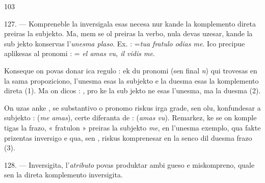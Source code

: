 \begin{VUpage}[107]{103}

127. --- Kompreneble la  inversigala esas necesa nur\nl
kande la komplemento direta preiras la subjekto. Ma, mem\nl
se ol preiras la verbo, nula  devas uzesar, kande la sub\cc
jekto konservas l'\textit{unesma plaso}. Ex. : \nl
=\textit{tua fratulo odias me}. Ico precipue aplikesas al pronomi :\nl
{} = \textit{el amas vu, il vidis me}.

Konseque on povas donar ica regulo : ek du pronomi\nl
(sen final \textit{n}) qui trovesas en la sama propoziciono, l'unesma\nl
esas la subjekto e la duesma esas la komplemento direta (1).\nl
Ma on dicos : , pro ke la sub\cc
jekto ne esas l'unesma, ma la duesma (2).

On uzas anke , se substantivo o pronomo riskus irga\cc
grade, sen olu, konfundesar a subjekto : \nl
{} (\textit{me amas}), certe diferanta de : \nl
{} (\textit{amas vu}). Remarkez, ke se on komple\cc
tigas la frazo, « fratulon » preiras la subjekto \textit{me}, en\nl
l'unesma exemplo, qua fakte prizentas inversigo e qua, sen ,\nl
riskus komprenesar en la senco dil duesma frazo (3).

\VUblanc{5.66pt}%
128. --- Inversigita, l'\textit{atributo} povas produktar ambi\cc
gueso e miskompreno, quale sen  la direta komplemento\nl
inversigita.


\end{VUpage}

